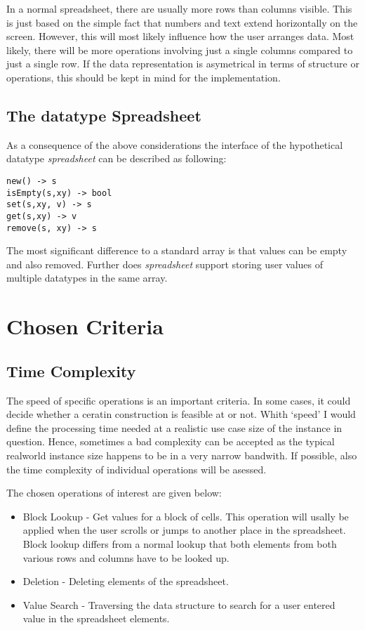 \documentclass[a4paper,11pt,twoside]{article}
\begin{document}
In a normal spreadsheet, there are usually more rows than columns
visible. This is just based on the simple fact that numbers and text
extend horizontally on the screen. However, this will most likely
influence how the user arranges data. Most likely, there will be more
operations involving just a single columns compared to just a single
row. If the data representation is asymetrical in terms of structure
or operations, this should be kept in mind for the implementation. 

\subsection{The datatype Spreadsheet}
As a consequence of the above considerations the interface of the
hypothetical datatype \textit{spreadsheet} can be described as following:

\begin{verbatim}
new() -> s
isEmpty(s,xy) -> bool
set(s,xy, v) -> s
get(s,xy) -> v
remove(s, xy) -> s
\end{verbatim}

The most significant difference to a standard array is that values can
be empty and also removed. Further does \textit{spreadsheet} support
storing user values of multiple datatypes in the same array. 




\section{Chosen Criteria}
\subsection{Time Complexity}
The speed of specific operations is an important criteria. In some
cases, it could decide whether a ceratin construction is feasible at
or not. Whith `speed' I would define the processing time needed at a
realistic use case size of the instance in question. Hence, sometimes
a bad complexity can be accepted as the typical realworld instance
size happens to be in a very narrow bandwith. If possible, also the
time complexity of individual operations will be asessed.    

The chosen operations of interest are given below:

\begin{itemize}
\item Block Lookup - Get values for a block of cells. This operation
  will usally be applied when the user scrolls or jumps to another
  place in the spreadsheet. Block lookup differs from a normal lookup
  that both elements from both various rows and columns have to be
  looked up. 
\item Deletion - Deleting elements of the spreadsheet.
\item Value Search - Traversing the data structure to search for a
  user entered value in the spreadsheet elements. 
\end{itemize}
\end{document}
